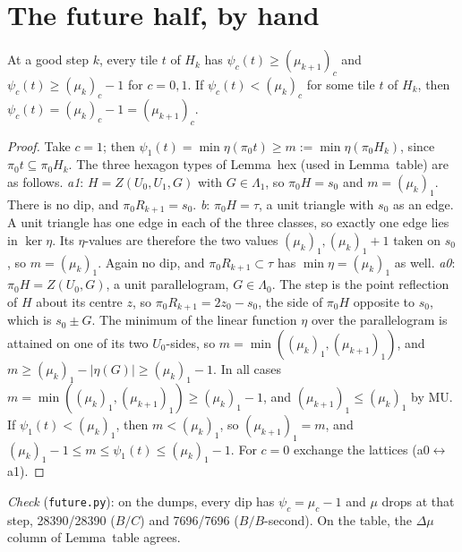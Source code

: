 \documentclass[11pt]{article}
\theoremstyle{definition}\newtheorem{definition}[theorem]{Definition}\newtheorem{remark}[theorem]{Remark}
\begin{document}
\section{The future half, by hand}\label{sec:F}
\begin{lemma}[dip]\label{lem:W}
At a good step $k$, every tile $t$ of $H_k$ has $\psi_c(t)\ge(\mu_{k+1})_c$ and $\psi_c(t)\ge(\mu_k)_c-1$ for $c=0,1$. If $\psi_c(t)<(\mu_k)_c$ for some tile $t$ of $H_k$, then $\psi_c(t)=(\mu_k)_c-1=(\mu_{k+1})_c$.
\end{lemma}
\begin{proof}
Take $c=1$; then $\psi_1(t)=\min\eta(\pi_0 t)\ge m:=\min\eta(\pi_0H_k)$, since $\pi_0t\subseteq\pi_0H_k$. The three hexagon types of Lemma~hex (used in Lemma~table) are as follows.
\emph{a1}: $H=Z(U_0,U_1,G)$ with $G\in\Lambda_1$, so $\pi_0H=s_0$ and $m=(\mu_k)_1$. There is no dip, and $\pi_0R_{k+1}=s_0$.
\emph{b}: $\pi_0H=\tau$, a unit triangle with $s_0$ as an edge. A unit triangle has one edge in each of the three classes, so exactly one edge lies in $\ker\eta$. Its $\eta$-values are therefore the two values $(\mu_k)_1,(\mu_k)_1+1$ taken on $s_0$, so $m=(\mu_k)_1$. Again no dip, and $\pi_0R_{k+1}\subset\tau$ has $\min\eta=(\mu_k)_1$ as well.
\emph{a0}: $\pi_0H=Z(U_0,G)$, a unit parallelogram, $G\in\Lambda_0$. The step is the point reflection of $H$ about its centre $z$, so $\pi_0R_{k+1}=2z_0-s_0$, the side of $\pi_0H$ opposite to $s_0$, which is $s_0\pm G$.
The minimum of the linear function $\eta$ over the parallelogram is attained on one of its two $U_0$-sides, so $m=\min((\mu_k)_1,(\mu_{k+1})_1)$, and $m\ge(\mu_k)_1-|\eta(G)|\ge(\mu_k)_1-1$.
In all cases $m=\min((\mu_k)_1,(\mu_{k+1})_1)\ge(\mu_k)_1-1$, and $(\mu_{k+1})_1\le(\mu_k)_1$ by MU. If $\psi_1(t)<(\mu_k)_1$, then $m<(\mu_k)_1$, so $(\mu_{k+1})_1=m$, and $(\mu_k)_1-1\le m\le\psi_1(t)\le(\mu_k)_1-1$.
For $c=0$ exchange the lattices (a0$\leftrightarrow$a1).
\end{proof}
\noindent\emph{Check} (\texttt{future.py}): on the dumps, every dip has $\psi_c=\mu_c-1$ and $\mu$ drops at that step, 28390/28390 ($B/C$) and 7696/7696 ($B/B$-second). On the table, the $\Delta\mu$ column of Lemma~table agrees.
\end{document}
